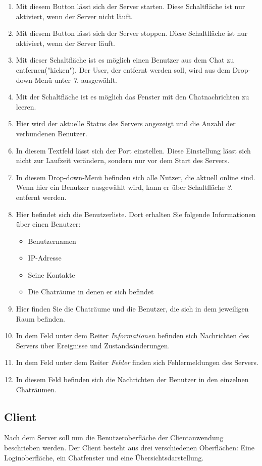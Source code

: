 \documentclass[12pt,a4paper,bibliography=totocnumbered,listof=totocnumbered]{scrartcl}
\begin{document}
\begin{enumerate}
	\item Mit diesem Button lässt sich der Server starten. Diese Schaltfläche ist nur aktiviert, wenn der Server nicht läuft.
	\item Mit diesem Button lässt sich der Server stoppen. Diese Schaltfläche ist nur aktiviert, wenn der Server läuft.
	\item Mit dieser Schaltfläche ist es möglich einen Benutzer aus dem Chat zu entfernen("kicken"). Der User, der entfernt werden soll, wird aus dem Drop-down-Menü unter \textit{7.} ausgewählt.
	\item Mit der Schaltfläche ist es möglich das Fenster mit den Chatnachrichten zu leeren.
	\item Hier wird der aktuelle Status des Servers angezeigt und die Anzahl der verbundenen Benutzer.
	\item In diesem Textfeld lässt sich der Port einstellen. Diese Einstellung lässt sich nicht zur Laufzeit verändern, sondern nur vor dem Start des Servers.
	\item In diesem Drop-down-Menü befinden sich alle Nutzer, die aktuell online sind. Wenn hier ein Benutzer ausgewählt wird, kann er über Schaltfläche \textit{3.} entfernt werden.
	\item Hier befindet sich die Benutzerliste. Dort erhalten Sie folgende Informationen über einen Benutzer:
		\begin{itemize}
			\item Benutzernamen
			\item IP-Adresse
			\item Seine Kontakte
			\item Die Chaträume in denen er sich befindet
		\end{itemize}
	
	\item Hier finden Sie die Chaträume und die Benutzer, die sich in dem jeweiligen Raum befinden.
	\item In dem Feld unter dem Reiter \textit{Informationen} befinden sich Nachrichten des Servers über Ereignisse und Zustandsänderungen.
	\item In dem Feld unter dem Reiter \textit{Fehler} finden sich Fehlermeldungen des Servers.
	\item In diesem Feld befinden sich die Nachrichten der Benutzer in den einzelnen Chaträumen.
\end{enumerate}
\newpage
\subsection{Client}
Nach dem Server soll nun die Benutzeroberfläche der Clientanwendung beschrieben werden. Der Client besteht aus drei verschiedenen Oberflächen: Eine Loginoberfläche, ein Chatfenster und eine Übersichtsdarstellung.
\end{document}
